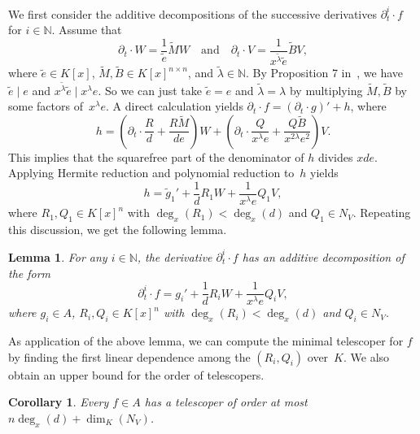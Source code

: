 \documentclass{sig-alternate}
\newtheorem{corollary}[theorem]{Corollary}
\newtheorem{lemma}[theorem]{Lemma}
\newcommand{\bN}{ {\mathbb N}}
\begin{document}
We first consider the additive decompositions of the successive derivatives $\partial_t^i\cdot f$ for $i\in \bN$.
Assume that
\[\partial_t\cdot W = \frac{1}{\tilde{e}} \tilde{M}W \quad \text{and}
\quad \partial_t\cdot V = \frac{1}{x^{\tilde{\lambda}} \tilde{e}} \tilde{B}V,\]
where $\tilde e \in K[x]$, $\tilde M, \tilde B\in K[x]^{n\times n}$, and $\tilde \lambda \in \bN$.
By Proposition 7 in~\cite{chen14a}, we have $\tilde e \mid e$ and $x^{\tilde{\lambda}} \tilde{e} \mid x^\lambda e$.
So we can just take $\tilde e = e$ and $\tilde{\lambda}  = \lambda$ by multiplying $\tilde M, \tilde B$ by some factors
of~$x^\lambda e$. A direct calculation yields $\partial_t\cdot f = (\partial_t\cdot g)' + h$,
where
\[h = \left(\partial_t\cdot\frac{R}{d}+\frac{R\tilde M}{de}\right)W + \left(\partial_t\cdot\frac{Q}{x^\lambda e}+ \frac{Q\tilde B}{x^{2\lambda} e^2}\right)V.\]
This implies that the squarefree part of the denominator of $h$ divides $xde$. Applying Hermite reduction and polynomial reduction
to~$h$ yields
\[ h = \tilde g_1' + \frac{1}{d} R_1W + \frac{1}{x^\lambda e} Q_1V,\]
where $R_1, Q_1\in K[x]^n$ with $\deg_x(R_1) < \deg_x(d)$ and $Q_1\in N_V$.
Repeating this discussion, we get the following lemma.
\begin{lemma}\label{LEM:idtf}
For any $i\in \bN$, the derivative $\partial_t^i\cdot f$ has an additive decomposition of the form
\[ \partial_t^i\cdot f = g_i' + \frac{1}{d} R_iW + \frac{1}{x^\lambda e} Q_iV,\]
where $g_i\in A$, $R_i, Q_i\in K[x]^n$ with $\deg_x(R_i) < \deg_x(d)$ and $Q_i\in N_V$.
\end{lemma}
As application of the above lemma, we can compute the minimal telescoper for $f$ by finding the first
linear dependence among the $(R_i, Q_i)$ over~$K$. We also obtain an upper bound for the order of telescopers.
\begin{corollary}
Every $f\in A$ has a telescoper of order at most $n\deg_x(d) + \dim_K(N_V)$.
\end{corollary}
\end{document}
